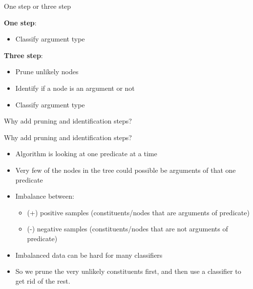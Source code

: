 \documentclass[10pt, compress]{beamer}
\begin{document}
\begin{frame}{One step or three step}

\textbf{One step}:
\begin{itemize}
  \item Classify argument type
\end{itemize}


\textbf{Three step}:
\begin{itemize}
  \item Prune unlikely nodes
  \item Identify if a node is an argument or not
  \item Classify argument type
\end{itemize}

Why add pruning and identification steps?

\end{frame}

\begin{frame}{Why add pruning and identification steps?}

\begin{itemize}
\item Algorithm is looking at one predicate at a time
\item Very few of the nodes in the tree could possible be arguments 
of that one predicate
\item Imbalance between: 
\begin{itemize}
\item (+) positive samples (constituents/nodes that are arguments of predicate)
\item (-) negative samples (constituents/nodes that are not arguments of predicate)
\end{itemize}
\item Imbalanced data can be hard for many classifiers
\item So we prune the very unlikely constituents first, and then use a classifier to get rid of the rest.
\end{itemize}

\end{frame}
\end{document}
